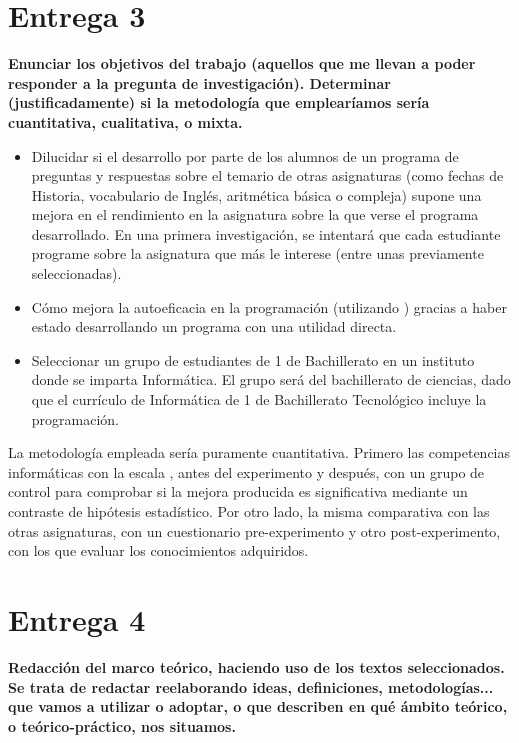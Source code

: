 \documentclass[palatino,nochap]{apuntesURJC}
\begin{document}
\section{Entrega 3}

\textbf{Enunciar los objetivos del trabajo (aquellos que me llevan a poder responder a la pregunta de investigación).
%
Determinar (justificadamente) si la metodología que emplearíamos sería cuantitativa, cualitativa, o mixta.}

\begin{itemize}
	\item Dilucidar si el desarrollo por parte de los alumnos de un programa de preguntas y respuestas sobre el temario de otras asignaturas (como fechas de Historia, vocabulario de Inglés, aritmética básica o compleja) supone una mejora en el rendimiento en la asignatura sobre la que verse el programa desarrollado.
	\subitem En una primera investigación, se intentará que cada estudiante programe sobre la asignatura que más le interese (entre unas previamente seleccionadas).
	\item Cómo mejora la autoeficacia en la programación (utilizando  \cite{CPSES}) gracias a haber estado desarrollando un programa con una utilidad directa.
	\item Seleccionar un grupo de estudiantes de 1 de Bachillerato en un instituto donde se imparta Informática. 
	El grupo será del bachillerato de ciencias, dado que el currículo de Informática de 1 de Bachillerato Tecnológico incluye la programación.

\end{itemize}

La metodología empleada sería puramente cuantitativa. 
%
Primero las competencias informáticas con la escala  \cite{CPSES}, antes del experimento y después, con un grupo de control para comprobar si la mejora producida es significativa mediante un contraste de hipótesis estadístico.
%
Por otro lado, la misma comparativa con las otras asignaturas, con un cuestionario pre-experimento y otro post-experimento, con los que evaluar los conocimientos adquiridos.

\section{Entrega 4}

\textbf{Redacción del marco teórico, haciendo uso de los textos seleccionados. Se trata de redactar reelaborando ideas, definiciones, metodologías... que vamos a utilizar o adoptar, o que describen en qué ámbito teórico, o teórico-práctico, nos situamos.}
\end{document}
